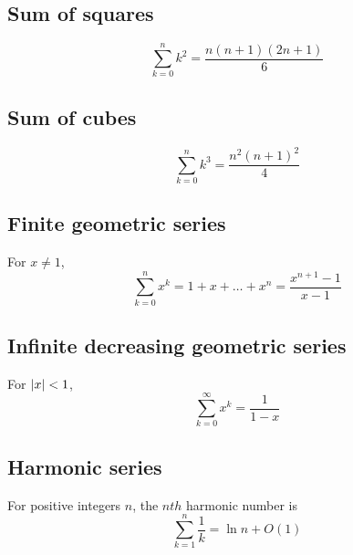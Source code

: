 \documentclass{article}
\begin{document}
    \subsection{Sum of squares}
        \begin{definition}
            \begin{equation}
                \sum_{k=0}^{n} k^2 = \frac{n(n+1)(2n+1)}{6}
            \end{equation}
        \end{definition}

    \subsection{Sum of cubes}
        \begin{definition}
            \begin{equation}
                \sum_{k=0}^{n} k^3 = \frac{n^2(n+1)^2}{4}
            \end{equation}
        \end{definition}

    \subsection{Finite geometric series}
        \begin{definition}
            For $x \neq 1$, 
            \begin{equation}
                \sum_{k=0}^{n} x^k = 1 + x + \ldots + x^n  = \frac{x^{n+1} - 1}{x-1} 
            \end{equation}
        \end{definition}

    \subsection{Infinite decreasing geometric series}
        \begin{definition}
            For $\abs{x} < 1$, 
            \begin{equation}
                \sum_{k=0}^{\infty} x^k = \frac{1}{1-x}
            \end{equation}
        \end{definition}

    \subsection{Harmonic series}
        \begin{definition}
            For positive integers $n$, the $nth$ harmonic number is
            \begin{equation}
                \sum_{k=1}^{n} \frac{1}{k} = \ln n + O(1)
            \end{equation}                
        \end{definition}
\end{document}
